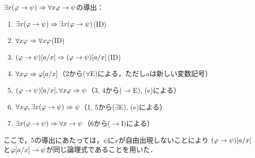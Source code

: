 \(\exists x \paren{\varphi \to \psi} \sequent \forall x \varphi \to \psi\)の導出：
\begin{enumerate}
	\item \(\exists x \paren{\varphi \to \psi} \sequent \exists x \paren{\varphi \to \psi}\)\quad (ID)
	\item \(\forall x \varphi \Rightarrow \forall x \varphi\)\quad (ID)
	\item \(\subst{\paren{\varphi \to \psi}}{a/x} \sequent \subst{\paren{\varphi \to \psi}}{a/x}\)\quad (ID)
	\item \(\forall x \varphi \sequent \subst{\varphi}{a/x}\)\quad （2から(\(\forall\)E)による，ただし\(a\)は新しい変数記号）
	\item \(\subst{\paren{\varphi \to \psi}}{a/x}, \forall x \varphi \sequent \psi\)\quad （3, 4から(\(\to\)E), (e)による）
	\item \(\forall x \varphi, \exists x \paren{\varphi \to \psi} \sequent \psi\)\quad （1, 5から(\(\exists\)E), (e)による）
	\item \(\exists x \paren{\varphi \to \psi} \sequent \forall x \to \psi\)\quad （6から(\(\to\)I)による）
\end{enumerate}
ここで，5の導出にあたっては，\(\psi\)に\(x\)が自由出現しないことにより
\(\subst{\paren{\varphi \to \psi}}{a/x}\)と\(\subst{\varphi}{a/x} \to \psi\)が同じ論理式であることを用いた．


